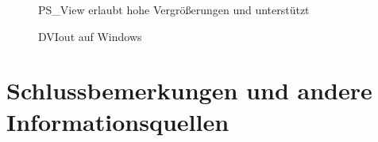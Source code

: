 \begin{figure}[ht!]
  \centering
  \caption{PS\_View erlaubt hohe Vergrößerungen und unterstützt }
  \label{fig:psview}
\end{figure}

\begin{figure}[ht!]
  \centering
  \caption{DVIout auf Windows}
  \label{fig:dviout}
\end{figure}

\section{Schlussbemerkungen und andere Informationsquellen}

